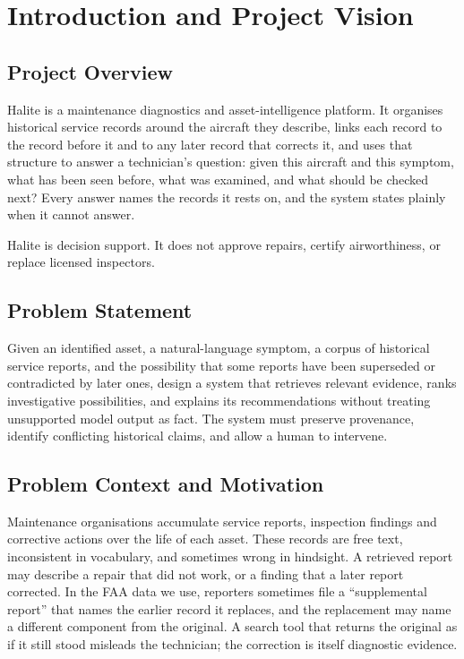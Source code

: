 \chapter{Introduction and Project Vision}

\section{Project Overview}

Halite is a maintenance diagnostics and asset-intelligence platform. It organises historical service records around the aircraft they describe, links each record to the record before it and to any later record that corrects it, and uses that structure to answer a technician's question: given this aircraft and this symptom, what has been seen before, what was examined, and what should be checked next? Every answer names the records it rests on, and the system states plainly when it cannot answer.

Halite is decision support. It does not approve repairs, certify airworthiness, or replace licensed inspectors.

\section{Problem Statement}

Given an identified asset, a natural-language symptom, a corpus of historical service reports, and the possibility that some reports have been superseded or contradicted by later ones, design a system that retrieves relevant evidence, ranks investigative possibilities, and explains its recommendations without treating unsupported model output as fact. The system must preserve provenance, identify conflicting historical claims, and allow a human to intervene.

\section{Problem Context and Motivation}

Maintenance organisations accumulate service reports, inspection findings and corrective actions over the life of each asset. These records are free text, inconsistent in vocabulary, and sometimes wrong in hindsight. A retrieved report may describe a repair that did not work, or a finding that a later report corrected. In the FAA data we use, reporters sometimes file a ``supplemental report'' that names the earlier record it replaces, and the replacement may name a different component from the original. A search tool that returns the original as if it still stood misleads the technician; the correction is itself diagnostic evidence.

